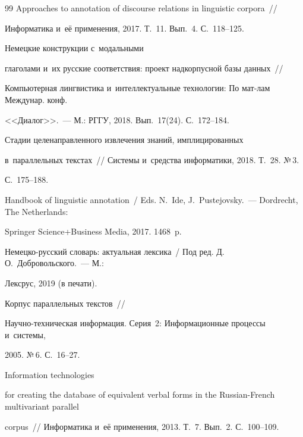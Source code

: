 {{\begin{thebibliography}{99}
 Approaches to annotation of discourse relations in linguistic corpora~/\!\!/ 


Информатика и~её применения, 2017. Т.~11. Вып.~4. С.~118--125.







 Немецкие конструкции с~модальными 


глаголами и~их русские соответствия: проект надкорпусной базы данных~/\!\!/ 


Компьютерная лингвистика и~интеллектуальные технологии: По мат-лам Междунар. конф. 


<<Диалог>>.~--- М.: РГГУ, 2018. Вып.~17(24). С.~172--184.




 Стадии целенаправленного извлечения знаний, имплицированных 


в~параллельных текстах~/\!\!/ Системы и~средства информатики, 2018. Т.~28. №\,3.  


С.~175--188.




Handbook of linguistic annotation~/ Eds. N.~Ide, J.~Pustejovsky.~--- Dordrecht, The Netherlands: 


Springer Science\;+\;Business Media, 2017. 1468~p.




Немецко-русский словарь: актуальная лексика~/ Под ред. Д.\,О.~Добровольского.~--- М.: 


Лексрус, 2019 (в печати).




 Корпус параллельных текстов~/\!\!/ 


На\-уч\-но-тех\-ни\-че\-ская информация. Серия~2: Информационные процессы и~системы, 


2005. №\,6. С.~16--27.




 Information technologies 


for creating the database of equivalent verbal forms in the Russian-French multivariant parallel 


corpus~/\!\!/ Информатика и~её применения, 2013. Т.~7. Вып.~2. С.~100--109.





\end{thebibliography}}}

